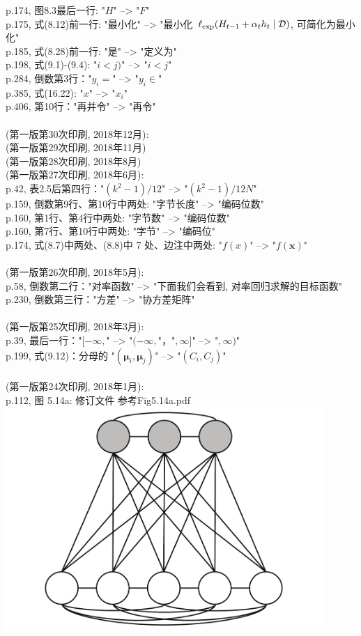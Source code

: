 \documentclass[UTF8]{article}
\begin{document}
p.174, 图8.3最后一行: "$H$" --> "$F$" \\
p.175, 式(8.12)前一行: "最小化" --> "最小化~$\ell_{\rm exp}(H_{t-1} + \alpha_t h_t \mid \mathcal{D})$, 可简化为最小化" \\
p.185, 式(8.28)前一行: "是" --> "定义为" \\
p.198, 式(9.1)-(9.4): "$i<j)$" --> "$i<j$" \\
p.284, 倒数第3行："$y_i =$" --> "$y_i \in$" \\
p.385, 式(16.22): "$x$" --> "$x_i$" \\
p.406, 第10行："再并令" --> "再令" \\
\\
(第一版第30次印刷, 2018年12月):
\\
(第一版第29次印刷, 2018年11月)
\\
(第一版第28次印刷, 2018年8月)
\\
(第一版第27次印刷, 2018年6月):
\\
p.42, 表2.5后第四行："$(k^2-1)/12$" --> "$(k^2-1)/12N$" \\
p.159, 倒数第9行、第10行中两处: "字节长度" --> "编码位数" \\
p.160, 第1行、第4行中两处: "字节数" --> "编码位数" \\
p.160, 第7行、第10行中两处: "字节" --> "编码位" \\
p.174, 式(8.7)中两处、(8.8)中 7 处、边注中两处: "$f(x)$" --> "$f(\bm{x})$" \\
\\
(第一版第26次印刷, 2018年5月):
\\
p.58, 倒数第二行："对率函数" --> "下面我们会看到, 对率回归求解的目标函数" \\
p.230, 倒数第三行："方差" --> "协方差矩阵" \\
\\
(第一版第25次印刷, 2018年3月):
\\
p.39, 最后一行："$[-\infty,$" --> "$(-\infty,$"，"$, \infty]$" --> "$, \infty)$" \\
p.199, 式(9.12)：分母的 "$(\bm{\mu}_i, \bm{\mu}_j)$" --> "$(C_i, C_j)$" \\
\\
(第一版第24次印刷, 2018年1月):
\\
p.112, 图 5.14a: 修订文件 参考Fig5.14a.pdf \\
\includegraphics[width=0.9\textwidth]{pic/Fig514a.pdf}\\
\end{document}
